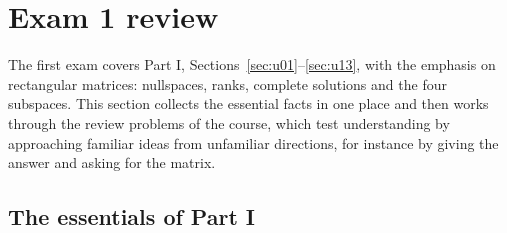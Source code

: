 \section{Exam 1 review}\label{sec:u14}

The first exam covers Part I, Sections~\ref{sec:u01}--\ref{sec:u13}, with the emphasis on
rectangular matrices: nullspaces, ranks, complete solutions and the four subspaces. This section
collects the essential facts in one place and then works through the review problems of the course,
which test understanding by approaching familiar ideas from unfamiliar directions, for instance by
giving the answer and asking for the matrix.

\subsection{The essentials of Part I}

